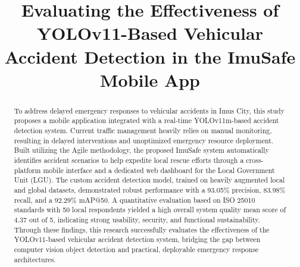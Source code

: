 \documentclass[conference]{IEEEtran}
\begin{document}
\title{Evaluating the Effectiveness of YOLOv11-Based Vehicular Accident Detection in the ImuSafe Mobile App
}

\author{
\and
{}
\and
{}
\and
{}
}

\maketitle

\begin{abstract}
To address delayed emergency responses to vehicular accidents in Imus City, this study proposes a mobile application integrated with a real-time YOLOv11m-based accident detection system. Current traffic management heavily relies on manual monitoring, resulting in delayed interventions and unoptimized emergency resource deployment. Built utilizing the Agile methodology, the proposed ImuSafe system automatically identifies accident scenarios to help expedite local rescue efforts through a cross-platform mobile interface and a dedicated web dashboard for the Local Government Unit (LGU). The custom accident detection model, trained on heavily augmented local and global datasets, demonstrated robust performance with a 93.05\% precision, 83.98\% recall, and a 92.29\% mAP@50. A quantitative evaluation based on ISO 25010 standards with 50 local respondents yielded a high overall system quality mean score of 4.37 out of 5, indicating strong usability, security, and functional sustainability. Through these findings, this research successfully evaluates the effectiveness of the YOLOv11-based vehicular accident detection system, bridging the gap between computer vision object detection and practical, deployable emergency response architectures.
\end{abstract}
\end{document}
